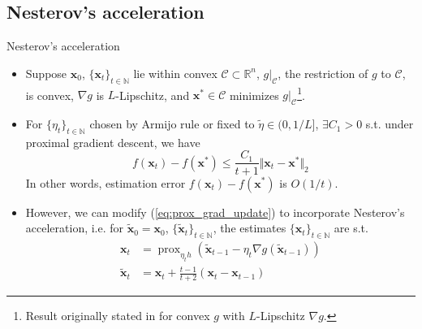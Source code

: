 \documentclass{beamer}
\numberwithin{equation}{section}
\newcommand{\aref}[1]{\alert{\ref{#1}}}
\begin{document}
\subsection{Nesterov's acceleration}

\begin{frame}{Nesterov's acceleration}
    \begin{itemize}
        \item
        Suppose $ \mathbf{x}_0 $, $ \{\mathbf{x}_t\}_{t \in \mathbb{N}} $ lie
        within convex $ \mathcal{C} \subset \mathbb{R}^n $, $ g|_\mathcal{C} $,
        the restriction of $ g $ to $ \mathcal{C} $, is convex, $ \nabla g $
        is $ L $-Lipschitz, and $ \mathbf{x}^* \in \mathcal{C} $ minimizes
        $ g|_\mathcal{C} $\footnote{
            Result originally stated in \cite{stat_learn_sparsity} for convex
            $ g $ with $ L $-Lipschitz $ \nabla g $.
        }.

        \item
        For $ \{\eta_t\}_{t \in \mathbb{N}} $ chosen by Armijo rule or fixed
        to $ \tilde{\eta} \in (0, 1 / L] $, $ \exists C_1 > 0 $ s.t. under
        proximal gradient descent, we have \cite{stat_learn_sparsity}
        \begin{equation} \label{eq:prox_grad_conv}
            f(\mathbf{x}_t) - f(\mathbf{x}^*) \le \frac{C_1}{t + 1}
            \Vert\mathbf{x}_t - \mathbf{x}^*\Vert_2
        \end{equation}
        In other words, estimation error $ f(\mathbf{x}_t) - f(\mathbf{x}^*) $
        is $ O(1 / t) $.

        \item
        However, we can modify (\aref{eq:prox_grad_update}) to incorporate
        Nesterov's acceleration, i.e. for $ \tilde{\mathbf{x}}_0 =
        \mathbf{x}_0 $, $ \{\tilde{\mathbf{x}}_t\}_{t \in \mathbb{N}} $, the
        estimates $ \{\mathbf{x}_t\}_{t \in \mathbb{N}} $ are s.t.
        \cite{stat_learn_sparsity}
        \begin{subequations} \label{eq:prox_grad_update_accel}
            \begin{align}
            \mathbf{x}_t & = \operatorname{prox}_{\eta_t h}(
                \tilde{\mathbf{x}}_{t - 1} - \eta_t\nabla g(
                    \tilde{\mathbf{x}}_{t - 1}
                )
            ) \label{eq:prox_grad_update_accel_a} \\
            \tilde{\mathbf{x}}_t & = \mathbf{x}_t + \frac{t - 1}{t + 2}(
                \mathbf{x}_t - \mathbf{x}_{t - 1}
            ) \label{eq:prox_grad_update_accel_b}
            \end{align}
        \end{subequations}
    \end{itemize}

    \medskip
\end{frame}
\end{document}
